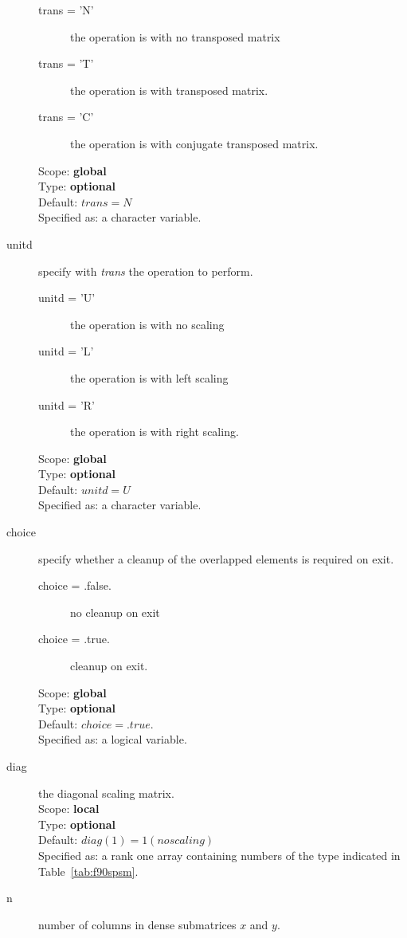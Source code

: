 \begin{description}
\begin{description}
\item[trans = 'N'] the operation is with no transposed matrix
\item[trans = 'T'] the operation is with transposed matrix.
\item[trans = 'C'] the operation is with conjugate transposed matrix.
\end{description}
Scope: {\bf global} \\
Type: {\bf optional}\\	
Default: $trans = N$\\	
Specified as: a character variable.
\item[unitd] specify with {\em trans} the operation to perform.
\begin{description}
\item[unitd = 'U'] the operation is with no scaling
\item[unitd = 'L'] the operation is with left scaling
\item[unitd = 'R'] the operation is with right scaling.
\end{description}
Scope: {\bf global} \\
Type: {\bf optional}\\	
Default: $unitd = U$\\	
Specified as: a character variable.
\item[choice] specify whether a cleanup of the overlapped elements is
required on exit.
\begin{description}
\item[choice = .false.] no cleanup on exit
\item[choice = .true.] cleanup on exit.\\
\end{description}
Scope: {\bf global} \\
Type: {\bf optional}\\	
Default: $choice = .true.$\\	
Specified as: a logical variable.
\item[diag] the diagonal scaling matrix.\\
Scope: {\bf local} \\
Type: {\bf optional}\\	
Default: $diag(1) = 1 (no scaling)$\\	
Specified as: a rank one  array containing numbers of the type
indicated in Table~\ref{tab:f90spsm}.
\item[n] number of columns in dense submatrices $x$ and $y$. \\

\end{description}
